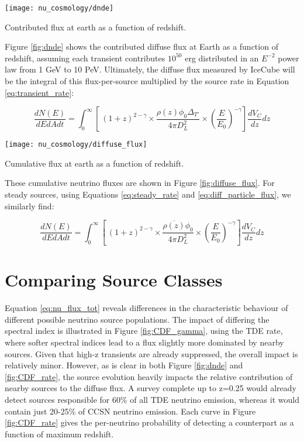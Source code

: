 \begin{marginfigure}
	\centering \texttt{[image: nu\_cosmology/dnde]}
	\caption{Contributed flux at earth as a function of redshift.}
	\label{fig:dnde}
\end{marginfigure}

Figure \ref{fig:dnde} shows the contributed diffuse flux at Earth as a function of redshift, assuming each transient contributes $10^{50}$ erg distributed in an $E^{-2}$ power law from 1 GeV to 10 PeV. Ultimately, the diffuse flux measured by IceCube will be the integral of this flux-per-source multiplied by the source rate in Equation \ref{eq:transient_rate}:

\begin{equation}
\frac{dN(E)}{dEdAdt} = \int_{0}^{\infty} \left[ \ (1+z)^{2 - \gamma} \times \frac{\rho(z)\phi_{0} \Delta_{T'}}{4 \pi D_{L}^{2}} \times \left( \frac{E}{E_{0}}\right) ^{-\gamma}  \right] \frac{dV_{C}}{dz} dz
\label{eq:nu_flux_tot}
\end{equation}

\begin{marginfigure}
	\centering \texttt{[image: nu\_cosmology/diffuse\_flux]}
	\caption{Cumulative flux at earth as a function of redshift.}
	\label{fig:diffuse_flux}
\end{marginfigure}

These cumulative neutrino fluxes are shown in Figure \ref{fig:diffuse_flux}. For steady sources, using Equations \ref{eq:steady_rate} and \ref{eq:diff_particle_flux}, we similarly find:

\begin{equation}
\frac{dN(E)}{dEdAdt} = \int_{0}^{\infty} \left[ \ (1+z)^{2 - \gamma} \times \frac{\overline{\rho(z)}\phi_{0}}{4 \pi D_{L}^{2}} \times \left( \frac{E}{E_{0}}\right) ^{-\gamma}  \right] \frac{dV_{C}}{dz} dz
\label{eq:nu_flux_tot_steady}
\end{equation}

\section{Comparing Source Classes}

Equation \ref{eq:nu_flux_tot} reveals differences in the characteristic behaviour of different possible neutrino source populations. The impact of differing the spectral index is illustrated in Figure \ref{fig:CDF_gamma}, using the TDE rate, where softer spectral indices lead to a flux slightly more dominated by nearby sources. Given that high-z transients are already suppressed, the overall impact is relatively minor. However, as is clear in both Figure \ref{fig:dnde} and \ref{fig:CDF_rate}, the source evolution heavily impacts the relative contribution of nearby sources to the diffuse flux. A survey complete up to z=0.25 would already detect sources responsible for 60\% of all TDE neutrino emission, whereas it would contain just 20-25\% of CCSN neutrino emission. Each curve in Figure \ref{fig:CDF_rate} gives the per-neutrino probability of detecting a counterpart as a function of maximum redshift.

